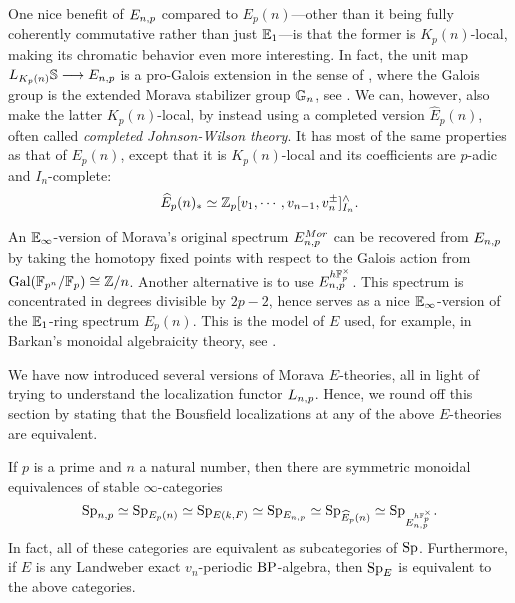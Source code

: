 \begin{remark}
    One nice benefit of $E_{n,p}$ compared to $E_p(n)$---other than it being fully coherently commutative rather than just $\mathbb{E}_1$---is that the former is $K_p(n)$-local, making its chromatic behavior even more interesting. In fact, the unit map $L_{K_p(n)}\mathbb{S} \longrightarrow E_{n,p}$ is a pro-Galois extension in the sense of \cite{rognes_08}, where the Galois group is the extended Morava stabilizer group $\mathbb{G}_n$, see \cite{devinatz-hopkins_2004}. We can, however, also make the latter $K_p(n)$-local, by instead using a completed version $\widehat{E}_p(n)$, often called \emph{completed Johnson-Wilson theory}. It has most of the same properties as that of $E_p(n)$, except that it is $K_p(n)$-local and its coefficients are $p$-adic and $I_n$-complete: 
    \[\widehat{E}_p(n)_* \simeq \mathbb{Z}_p[v_1, \cdots, v_{n-1}, v_n^{\pm}]^\wedge_{I_n}.\]
\end{remark}

\begin{remark}
    An $\mathbb{E}_\infty$-version of Morava's original spectrum $E_{n,p}^{Mor}$ can be recovered from $E_{n,p}$ by taking the homotopy fixed points with respect to the Galois action from $\mathrm{Gal}(\mathbb{F}_{p^n}/\mathbb{F}_p)\cong \mathbb{Z}/n$. Another alternative is to use $E_{n,p}^{h\mathbb{F}_p^\times}$. This spectrum is concentrated in degrees divisible by $2p-2$, hence serves as a nice $\mathbb{E}_\infty$-version of the $\mathbb{E}_1$-ring spectrum $E_p(n)$. This is the model of $E$ used, for example, in Barkan's monoidal algebraicity theory, see \cite{barkan_2023}. 
\end{remark}

We have now introduced several versions of Morava $E$-theories, all in light of trying to understand the localization functor $L_{n,p}$. Hence, we round off this section by stating that the Bousfield localizations at any of the above $E$-theories are equivalent. 

\begin{proposition}
    \label{ch0:prop:all-E-local-cats-are-equivalent}
    If $p$ is a prime and $n$ a natural number, then there are symmetric monoidal equivalences of stable $\infty$-categories 
    \[\mathrm{Sp}_{n,p} \simeq \mathrm{Sp}_{E_p(n)} \simeq \mathrm{Sp}_{E(k,F)}\simeq \mathrm{Sp}_{E_{n,p}} \simeq \mathrm{Sp}_{\widehat{E}_p(n)}\simeq \mathrm{Sp}_{E_{n,p}^{h\mathbb{F}_p^\times}}.\]
    In fact, all of these categories are equivalent as subcategories of $\mathrm{Sp}$. Furthermore, if $E$ is any Landweber exact $v_n$-periodic $\mathrm{BP}$-algebra, then $\mathrm{Sp}_E$ is equivalent to the above categories. 
\end{proposition}

